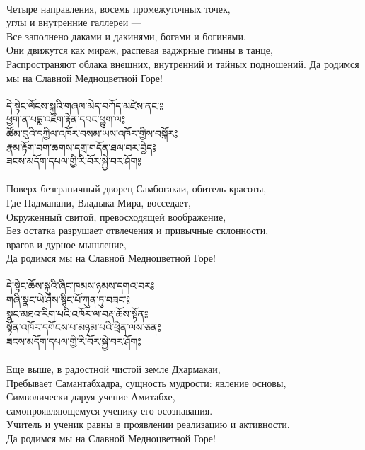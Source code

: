 \\
Четыре направления, восемь промежуточных точек, \\ \indent углы и внутренние галлереи —\\
Все заполнено даками и дакинями, богами и богинями,\\
Они движутся как мираж, распевая ваджрные гимны в танце,\\
Распространяют облака внешних, внутренний и тайных подношений.
Да родимся мы на Славной Медноцветной Горе!\\
\\
{\ti དེ་སྟེང་ལོངས་སྐུའི་གཞལ་མེད་བཀོད་མཛེས་ནང་༔\\
ཕྱག་ན་པདྨ་འཇིག་རྟེན་དབང་ཕྱུག་ལ༔\\
ཚོམ་བུའི་དཀྱིལ་འཁོར་བསམ་ཡས་འཁོར་གྱིས་བསྐོར༔\\
རྣམ་རྟོག་བག་ཆགས་དགྲ་གདོན་ཐལ་བར་བྱེད༔\\
ཟངས་མདོག་དཔལ་གྱི་རི་བོར་སྐྱེ་བར་ཤོག༔}\\
\\
Поверх безграничный дворец Самбогакаи, обитель красоты,\\
Где Падмапани, Владыка Мира, восседает,\\
Окруженный свитой, превосходящей воображение,\\
Без остатка разрушает отвлечения и привычные склонности, \\ \indent врагов и дурное мышление,\\
Да родимся мы на Славной Медноцветной Горе!\\
\\
\newpage
{\ti དེ་སྟེང་ཆོས་སྐུའི་ཞིང་ཁམས་ཉམས་དགའ་བར༔\\
གཞི་སྣང་ཡེ་ཤེས་སྙིང་པོ་ཀུན་ཏུ་བཟང་༔\\
སྣང་མཐའ་རིག་པའི་འཁོར་ལ་བརྡ་ཆོས་སྟོན༔\\
སྟོན་འཁོར་དགོངས་པ་མཉམ་པའི་ཕྲིན་ལས་ཅན༔\\
ཟངས་མདོག་དཔལ་གྱི་རི་བོར་སྐྱེ་བར་ཤོག༔}\\
\\
\ru
Еще выше, в радостной чистой земле Дхармакаи,\\
Пребывает Самантабхадра, сущность мудрости: явление основы,\\
Символически даруя учение Амитабхе, \\ \indent самопроявляющемуся ученику его осознавания.\\
Учитель и ученик равны в проявлении реализацию и активности.\\
Да родимся мы на Славной Медноцветной Горе!\\
